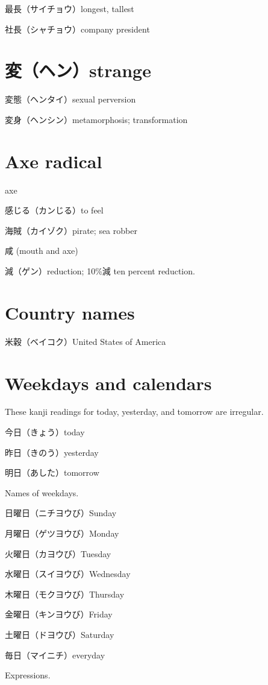 最長（サイチョウ）longest, tallest

社長（シャチョウ）company president

\section{変（ヘン）strange}

変態（ヘンタイ）sexual perversion

変身（ヘンシン）metamorphosis; transformation

\section{Axe radical}

axe

感じる（カンじる）to feel

海賊（カイゾク）pirate; sea robber

咸 (mouth and axe)

減（ゲン）reduction; 10\%減 ten percent reduction.

\section{Country names}

米穀（ベイコク）United States of America

\section{Weekdays and calendars}

These kanji readings for today, yesterday, and tomorrow are irregular.

今日（きょう）today

昨日（きのう）yesterday

明日（あした）tomorrow

Names of weekdays.

日曜日（ニチヨウび）Sunday

月曜日（ゲツヨウび）Monday

火曜日（カヨウび）Tuesday

水曜日（スイヨウび）Wednesday

木曜日（モクヨウび）Thursday

金曜日（キンヨウび）Friday

土曜日（ドヨウび）Saturday

毎日（マイニチ）everyday

Expressions.

